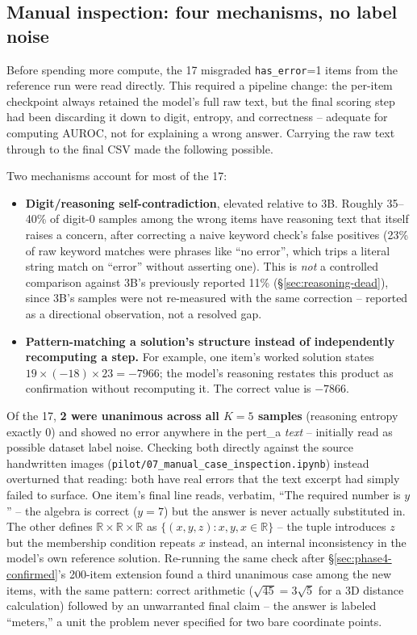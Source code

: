 \documentclass[11pt]{article}
\begin{document}
\subsection{Manual inspection: four mechanisms, no label noise}
\label{sec:phase4-inspection}

Before spending more compute, the 17 misgraded \texttt{has\_error}=1 items
from the reference run were read directly. This required a pipeline change:
the per-item checkpoint always retained the model's full raw text, but the
final scoring step had been discarding it down to digit, entropy, and
correctness -- adequate for computing AUROC, not for explaining a wrong
answer. Carrying the raw text through to the final CSV made the following
possible.

Two mechanisms account for most of the 17:

\begin{itemize}
  \item \textbf{Digit/reasoning self-contradiction}, elevated relative to 3B.
    Roughly 35--40\% of digit-0 samples among the wrong items have reasoning
    text that itself raises a concern, after correcting a naive keyword
    check's false positives (23\% of raw keyword matches were phrases like
    ``no error'', which trips a literal string match on ``error'' without
    asserting one). This is \emph{not} a controlled comparison against 3B's
    previously reported 11\% (\S\ref{sec:reasoning-dead}), since 3B's samples
    were not re-measured with the same correction -- reported as a
    directional observation, not a resolved gap.
  \item \textbf{Pattern-matching a solution's structure instead of
    independently recomputing a step.} For example, one item's worked
    solution states $19 \times (-18) \times 23 = -7966$; the model's
    reasoning restates this product as confirmation without recomputing it.
    The correct value is $-7866$.
\end{itemize}

Of the 17, \textbf{2 were unanimous across all $K=5$ samples} (reasoning
entropy exactly 0) and showed no error anywhere in the pert\_a \emph{text} --
initially read as possible dataset label noise. Checking both directly
against the source handwritten images
(\texttt{pilot/07\_manual\_case\_inspection.ipynb}) instead overturned that
reading: both have real errors that the text excerpt had simply failed to
surface. One item's final line reads, verbatim, ``The required number is
$y$'' -- the algebra is correct ($y=7$) but the answer is never actually
substituted in. The other defines $\mathbb{R}\times\mathbb{R}\times\mathbb{R}$
as $\{(x,y,z) : x, y, x \in \mathbb{R}\}$ -- the tuple introduces $z$ but the
membership condition repeats $x$ instead, an internal inconsistency in the
model's own reference solution. Re-running the same check after
\S\ref{sec:phase4-confirmed}'s 200-item extension found a third unanimous
case among the new items, with the same pattern: correct arithmetic
($\sqrt{45}=3\sqrt{5}$ for a 3D distance calculation) followed by an
unwarranted final claim -- the answer is labeled ``meters,'' a unit the
problem never specified for two bare coordinate points.
\end{document}
